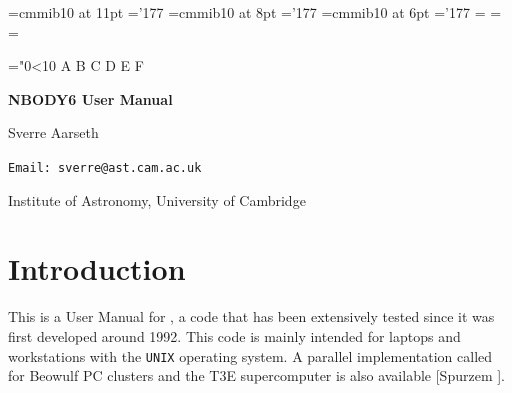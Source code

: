 \documentclass[12pt]{article}
\begin{document}
\def\AJ{{\it Astron. J.} }
\def\APJ{{\it Astrophys. J.} }
\def\ApJ{{\it Astrophys. J.} }
\def\MN{{\it Mon. Not. R. Astron. Soc.} }
\def\AA{{\it Astron. Astrophys.} }
\def\CM{{\it Celes. Mech.} }
\def\CMD{{\it Celes. Mech. Dyn. Ast.} }
\def\PASJ{{\it Publ. Astron. Soc. Japan} }
\def\SJA{S.J. Aarseth}
\def\SAA{S.J. Aarseth }


\font\elevenmib=cmmib10 at 11pt \skewchar\elevenmib='177
\font\eightmib=cmmib10 at 8pt   \skewchar\eightmib='177
\font\sixmib=cmmib10 at 6pt     \skewchar\sixmib='177
%
\newfam\mibfam
\textfont\mibfam=\elevenmib
\scriptfont\mibfam=\eightmib
\scriptscriptfont\mibfam=\sixmib

\def\hexnum#1{\ifnum#1<10 \number#1\else
 \ifnum#1=10 A\else\ifnum#1=11 B\else\ifnum#1=12 C\else
 \ifnum#1=13 D\else\ifnum#1=14 E\else\ifnum#1=15 F\fi\fi\fi\fi\fi\fi\fi}
\def\mib{\hexnum\mibfam}

\mathchardef\bmu="0\mib16

 
 
\centerline {\Large {\bf {NBODY6 User Manual~~~~}}}
\bigskip
\centerline {\Large {Sverre Aarseth~~~}}
\bigskip
\centerline {\large {\tt Email: sverre@ast.cam.ac.uk}~~~~~}
\bigskip
\centerline {\large {Institute of Astronomy, University of Cambridge~~~~}}
\medskip
\bigskip
\section{Introduction}

This is a User Manual for {}, a code that has been extensively
tested since it was first developed around 1992.
This code is mainly intended for laptops and workstations with the {\tt UNIX}
operating system.
A parallel implementation called {} for Beowulf PC
clusters and the T3E supercomputer is also available [Spurzem ].
\end{document}
